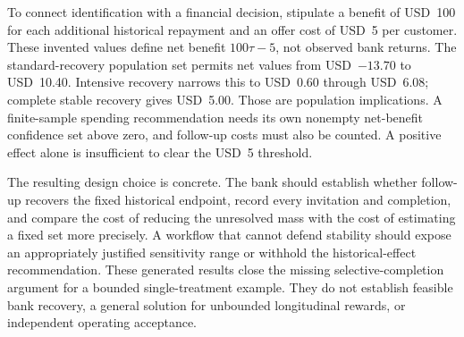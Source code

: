 To connect identification with a financial decision, stipulate a benefit of
USD~100 for each additional historical repayment and an offer cost of USD~5
per customer. These invented values define net benefit $100\tau-5$, not
observed bank returns. The standard-recovery population set permits net
values from USD~$-13.70$ to USD~10.40. Intensive recovery narrows this to
USD~0.60 through USD~6.08; complete stable recovery gives USD~5.00. Those
are population implications. A finite-sample spending recommendation needs
its own nonempty net-benefit confidence set above zero, and follow-up costs
must also be counted. A positive effect alone is insufficient to clear the
USD~5 threshold.

The resulting design choice is concrete. The bank should establish whether
follow-up recovers the fixed historical endpoint, record every invitation and
completion, and compare the cost of reducing the unresolved mass with the
cost of estimating a fixed set more precisely. A workflow that cannot defend
stability should expose an appropriately justified sensitivity range or
withhold the historical-effect recommendation. These generated results close
the missing selective-completion argument for a bounded single-treatment
example. They do not establish feasible bank recovery, a general solution
for unbounded longitudinal rewards, or independent operating acceptance.



